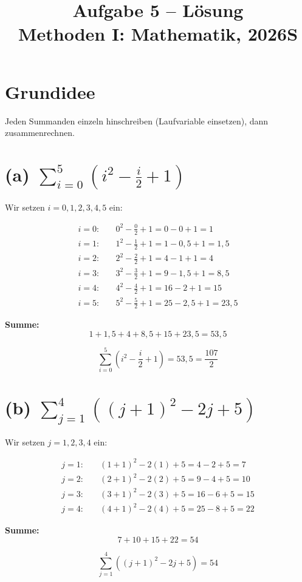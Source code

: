 \documentclass[12pt, a4paper]{article}
\title{\textbf{Aufgabe 5 -- Lösung} \\ Methoden I: Mathematik, 2026S}
\author{}
\date{}
\begin{document}
\maketitle

\section*{Grundidee}
Jeden Summanden einzeln hinschreiben (Laufvariable einsetzen), dann zusammenrechnen.

\section*{(a) $\displaystyle\sum_{i=0}^{5} \left(i^2 - \frac{i}{2} + 1\right)$}

Wir setzen $i = 0, 1, 2, 3, 4, 5$ ein:

\begin{align*}
    i = 0: &\quad 0^2 - \frac{0}{2} + 1 = 0 - 0 + 1 = 1 \\
    i = 1: &\quad 1^2 - \frac{1}{2} + 1 = 1 - 0{,}5 + 1 = 1{,}5 \\
    i = 2: &\quad 2^2 - \frac{2}{2} + 1 = 4 - 1 + 1 = 4 \\
    i = 3: &\quad 3^2 - \frac{3}{2} + 1 = 9 - 1{,}5 + 1 = 8{,}5 \\
    i = 4: &\quad 4^2 - \frac{4}{2} + 1 = 16 - 2 + 1 = 15 \\
    i = 5: &\quad 5^2 - \frac{5}{2} + 1 = 25 - 2{,}5 + 1 = 23{,}5
\end{align*}

\textbf{Summe:}
\[
    1 + 1{,}5 + 4 + 8{,}5 + 15 + 23{,}5 = 53{,}5
\]

\[
    \boxed{\sum_{i=0}^{5} \left(i^2 - \frac{i}{2} + 1\right) = 53{,}5 = \frac{107}{2}}
\]

\section*{(b) $\displaystyle\sum_{j=1}^{4} \left((j+1)^2 - 2j + 5\right)$}

Wir setzen $j = 1, 2, 3, 4$ ein:

\begin{align*}
    j = 1: &\quad (1+1)^2 - 2(1) + 5 = 4 - 2 + 5 = 7 \\
    j = 2: &\quad (2+1)^2 - 2(2) + 5 = 9 - 4 + 5 = 10 \\
    j = 3: &\quad (3+1)^2 - 2(3) + 5 = 16 - 6 + 5 = 15 \\
    j = 4: &\quad (4+1)^2 - 2(4) + 5 = 25 - 8 + 5 = 22
\end{align*}

\textbf{Summe:}
\[
    7 + 10 + 15 + 22 = 54
\]

\[
    \boxed{\sum_{j=1}^{4} \left((j+1)^2 - 2j + 5\right) = 54}
\]
\end{document}
